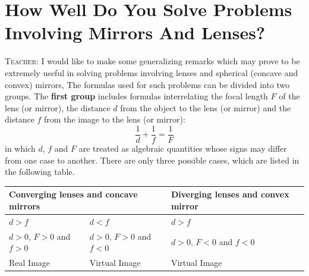 \documentclass[a4paper,sfsidenotes]{tufte-book}
\begin{document}
\chapter{How Well Do You Solve Problems Involving Mirrors And Lenses?}
\label{ch-33}

\textsc{Teacher:} I would like to make some generalizing remarks which may prove to be extremely useful in solving problems involving lenses and spherical (concave and convex) mirrors, The formulas used for such problems can be divided into two groups.  The \textbf{first group} includes formulas interrelating the focal length $F$ of the lens (or mirror), the distance $d$ from the object to the lens (or mirror) and the distance $f$ from the image to the lens (or mirror):
\begin{equation}
\frac{1}{d}+\frac{1}{f} = \frac{1}{F} 
\label{eq-195}
\end{equation}
in which $d$, $f$ and $F$ are treated as algebraic quantities whose signs may differ from one case to another. There are only three possible cases, which are listed in the following table.


\begin{table}
\begin{tabular}{p{4cm}p{4cm}p{5.5cm}}
\toprule%
\multicolumn{2}{l}{Converging lenses and concave mirrors} & Diverging lenses and convex mirror\\
\midrule%
$d > f$ & $d<f$ & $d > f$\\
$d > 0$, $F > 0$ and $f > 0$ & $d>0$, $F>0$ and $f<0$ & $d > 0$, $F < 0$ and $f < 0$\\
Real Image & Virtual Image &Virtual Image\\
\bottomrule%
\end{tabular}
\end{table}
\vspace{8pt}
\end{document}
